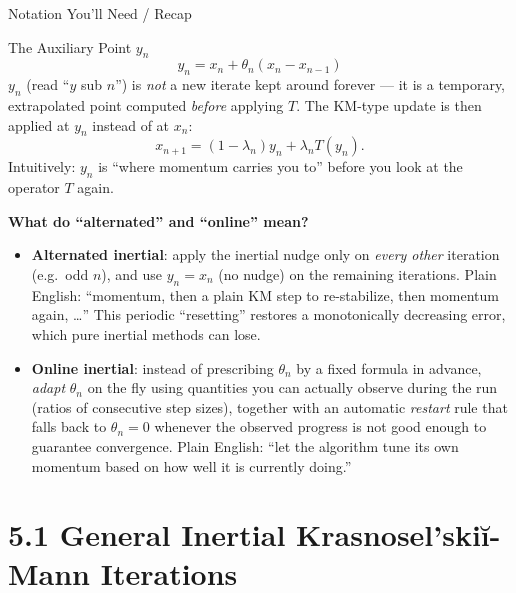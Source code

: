 \documentclass[aspectratio=169,10pt]{beamer}
\begin{document}
\begin{frame}[allowframebreaks]{Notation You'll Need / Recap}
  \framebreak

  \begin{block}{The Auxiliary Point $y_n$}
    \[
      y_n = x_n + \theta_n(x_n - x_{n-1})
    \]
    $y_n$ (read ``$y$ sub $n$'') is \emph{not} a new iterate kept
    around forever --- it is a temporary, extrapolated point
    computed \emph{before} applying $T$.  The KM-type update is
    then applied at $y_n$ instead of at $x_n$:
    \[
      x_{n+1} = (1-\lambda_n)y_n + \lambda_n T(y_n).
    \]
    Intuitively: $y_n$ is ``where momentum carries you to'' before
    you look at the operator $T$ again.
  \end{block}

  \textbf{What do ``alternated'' and ``online'' mean?}
  \begin{itemize}
    \item \textbf{Alternated inertial}: apply the inertial nudge
          only on \emph{every other} iteration (e.g.\ odd $n$), and
          use $y_n = x_n$ (no nudge) on the remaining iterations.
          Plain English: ``momentum, then a plain KM step to
          re-stabilize, then momentum again, \ldots'' This periodic
          ``resetting'' restores a monotonically decreasing error,
          which pure inertial methods can lose.
    \item \textbf{Online inertial}: instead of prescribing
          $\theta_n$ by a fixed formula in advance, \emph{adapt}
          $\theta_n$ on the fly using quantities you can actually
          observe during the run (ratios of consecutive step
          sizes), together with an automatic \emph{restart} rule
          that falls back to $\theta_n=0$ whenever the observed
          progress is not good enough to guarantee convergence.
          Plain English: ``let the algorithm tune its own
          momentum based on how well it is currently doing.''
  \end{itemize}

\end{frame}

\section{5.1 General Inertial Krasnosel'ski\u{i}-Mann Iterations}
\end{document}
